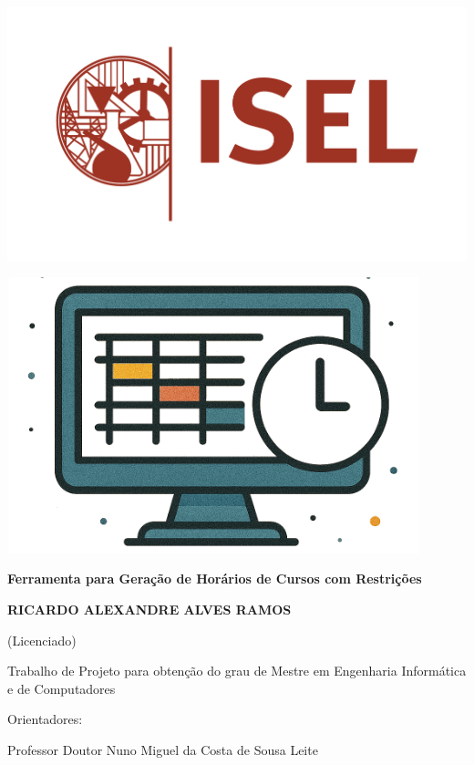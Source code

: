\documentclass[11pt,a4paper]{report}
\begin{document}

\begin{titlepage}
    \centering
    {\includegraphics[width=0.4\linewidth]{Imagens/logo_ISEL_simplificado_cor.png}}

    {\includegraphics[width=12cm, height=8cm]{Imagens/imagem_capa.png}}
    
    \vfill
    
    {\bfseries\fontsize{17}{20}\selectfont Ferramenta para Geração de Horários de Cursos com Restrições}
    \vspace{1cm}
    
    {\bfseries\fontsize{15}{18}\selectfont RICARDO ALEXANDRE ALVES RAMOS \par}
    {\fontsize{13}{16}\selectfont (Licenciado)}
    \vspace{1cm}
    
    {\fontsize{10}{12}\selectfont Trabalho de Projeto para obtenção do grau de Mestre em Engenharia Informática\\ e de Computadores}
    
	\vfill

    \begin{center}
        \parbox[h]{0.7\textwidth}{
        \raggedright
            {\hspace{1cm}\fontsize{11}{13}\selectfont Orientadores:}
            
            {\hspace{2cm}\fontsize{10}{12}\selectfont Professor Doutor Nuno Miguel da Costa de Sousa Leite}
            
}
\end{center}
\end{titlepage}
\end{document}
